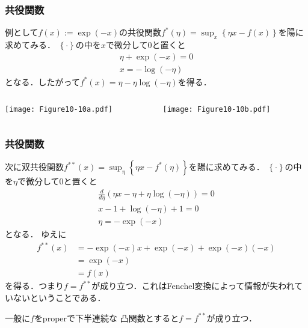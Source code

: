 \documentclass[10pt,usepdftitle=false,hyperref={unicode}]{beamer}
\newcommand{\parentheses}[1]{\left(#1\right)}
\newcommand{\braces}[1]{\left\{#1\right\}}
\begin{document}
\begin{frame}
\frametitle{共役関数}
例として$f\parentheses{x} := \exp \parentheses{-x}$の共役関数$f^*\parentheses{\eta} = \sup_{x}\braces{\eta x - f\parentheses{x}}$を陽に求めてみる．
$\braces{\cdot}$の中を$x$で微分して$0$と置くと
\begin{gather*}
    \eta + \exp \parentheses{-x} = 0 \\
    x = - \log \parentheses{-\eta}
\end{gather*}
となる．したがって$f^*\parentheses{x} = \eta - \eta \log \parentheses{-\eta}$を得る．

    \begin{columns}
        \begin{column}{0.5\textwidth}
            \begin{center}
                \texttt{[image: Figure10-10a.pdf]}
            \end{center}
        \end{column}
        \begin{column}{0.5\textwidth}
            \begin{center}
                \texttt{[image: Figure10-10b.pdf]}
            \end{center}
        \end{column}
    \end{columns}


\end{frame}

\begin{frame}
\frametitle{共役関数}

次に双共役関数$f^{**}\parentheses{x} = \sup_\eta \braces{\eta x - f^*\parentheses{\eta}}$を陽に求めてみる．
$\braces{\cdot}$の中を$\eta$で微分して$0$と置くと
\begin{gather*}
    \frac{d}{d\eta} \parentheses{\eta x - \eta + \eta \log \parentheses{-\eta}} = 0 \\
    x - 1 + \log \parentheses{-\eta} + 1 = 0 \\
    \eta = - \exp \parentheses{-x}
\end{gather*}
となる．
ゆえに
\begin{align*}
    f^{**}\parentheses{x}
    &= - \exp \parentheses{-x}x + \exp \parentheses{-x} + \exp \parentheses{-x} \parentheses{-x} \\
    &= \exp \parentheses{-x} \\
    &= f\parentheses{x}
\end{align*}
を得る．つまり$f = f^{**}$が成り立つ．これはFenchel変換によって情報が失われていないということである．

\bigskip

一般に$f$をproperで下半連続な
凸関数とすると$f = f^{**}$が成り立つ．
\end{frame}
\end{document}
